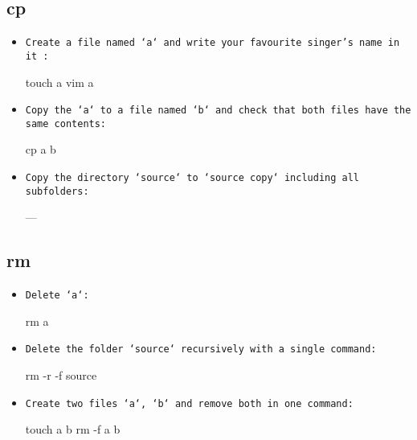 \documentclass[10pt,a4paper]{scrartcl}
\begin{document}
\subsection{cp}

\begin{itemize}

\item \texttt{Create a file named `a` and write your favourite singer's name in it :}

\begin{terminalcode}
touch a
vim a
\end{terminalcode}

\item \texttt{Copy the `a` to a file named `b` and check that both files have the same contents:}
\begin{terminalcode}
cp a b
\end{terminalcode}

\item \texttt{Copy the directory `source` to `source copy` including all subfolders:}
\begin{terminalcode}
---
\end{terminalcode}

\end{itemize}

\subsection{rm}

\begin{itemize}

\item \texttt{Delete `a`:}

\begin{terminalcode}
rm a
\end{terminalcode}

\item \texttt{Delete the folder `source` recursively with a single command:}
\begin{terminalcode}
rm -r -f source
\end{terminalcode}

\item \texttt{Create two files `a`, `b` and remove both in one command:}

\begin{terminalcode}
touch a b
rm -f a b
\end{terminalcode}

\end{itemize}
\end{document}
